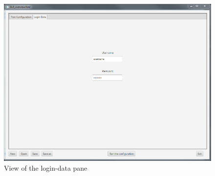 \begin{figure}[p]
\centering
\includegraphics[width=\textwidth]{gui_login.png}
\caption{View of the login-data pane}
\end{figure}
